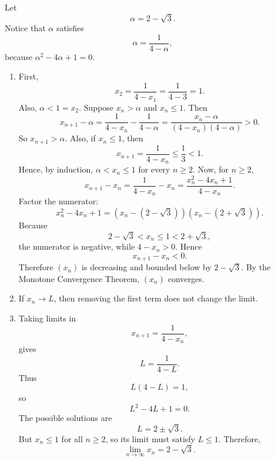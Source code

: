 \documentclass[12pt]{article}
\begin{document}
Let
\[
    \alpha=2-\sqrt3.
\]Notice that \(\alpha\) satisfies
\[
    \alpha=\frac1{4-\alpha},
\]because \(\alpha^2-4\alpha+1=0\).
\begin{enumerate}
    \item [(a)]
          First,
          \[
              x_2=\frac1{4-x_1}=\frac1{4-3}=1.
          \]
          Also, \(\alpha<1=x_2\). Suppose \(x_n>\alpha\) and \(x_n\le 1\). Then
          \[
              x_{n+1}-\alpha
              =
              \frac1{4-x_n}-\frac1{4-\alpha}
              =
              \frac{x_n-\alpha}{(4-x_n)(4-\alpha)}>0.
          \]
          So \(x_{n+1}>\alpha\). Also, if \(x_n\le1\), then
          \[
              x_{n+1}=\frac{1}{4-x_n}\le\frac13<1.
          \]
          Hence, by induction, \(\alpha<x_n\le1\) for every \(n\ge2\).
          Now, for \(n\ge2\),
          \[
              x_{n+1}-x_n
              =
              \frac1{4-x_n}-x_n
              =
              \frac{x_n^2-4x_n+1}{4-x_n}.
          \]Factor the numerator:
          \[
              x_n^2-4x_n+1
              =
              (x_n-(2-\sqrt3))(x_n-(2+\sqrt3)).
          \]Because
          \[
              2-\sqrt3<x_n\le1<2+\sqrt3,
          \]the numerator is negative, while \(4-x_n>0\). Hence
          \[
              x_{n+1}-x_n<0.
          \]Therefore \((x_n)\) is decreasing and bounded below by \(2-\sqrt3\). By the Monotone Convergence Theorem, \((x_n)\) converges.
    \item [(b)] If \(x_n\to L\), then removing the first term does not change the limit.
    \item [(c)] Taking limits in
          \[
              x_{n+1}=\frac1{4-x_n},
          \]
          gives
          \[
              L=\frac1{4-L}.
          \]
          Thus
          \[
              L(4-L)=1,
          \]
          so
          \[
              L^2-4L+1=0.
          \]
          The possible solutions are
          \[
              L=2\pm\sqrt3.
          \]
          But \(x_n\le1\) for all \(n\ge2\), so its limit must satisfy \(L\le1\). Therefore,
          \[
              \lim_{n\to\infty}x_n=2-\sqrt3.
          \]
\end{enumerate}
\end{document}
